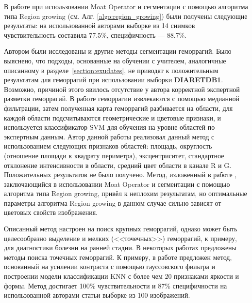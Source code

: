 \documentclass[12pt,fleqn]{article}
\begin{document}

В работе \cite{sinthanayothin} при использовании Moat Operator и сегментации с помощью алгоритма типа Region growing (см. Алг. \ref{algo:region_growing}) были получены следующие результаты: на использованной авторами выборке из 14 снимков чувствительность составила 77.5\%, специфичность --- 88.7\%.

Автором были исследованы и другие методы сегментации геморрагий. Было выяснено, что подходы, основанные на обучении с учителем, аналогичные описанному в разделе~\ref{section:exudates}, не приводят к положительным результатам для геморрагий при использовании выборки \textbf{DIARETDB1}. Возможно, причиной этого явилось отсутствие у автора корректной экспертной разметки геморрагий. В работе \cite{chernomorets} геморрагии извлекаются с помощью медианной фильтрации, затем полученная карта геморрагий разбивается на области, для каждой области подсчитываются геометрические и цветовые признаки, и используется классификатор SVM для обучения на уровне областей по экспертным данным. Автор данной работы реализовал данный метод с использованием следующих признаков областей: площадь, округлость (отношение площади к квадрату периметра), эксцентриситет, стандартное отклонение интенсивности в области, средний цвет области в канале R и G. Положительных результатов не было получено. Метод, изложенный в работе \cite{sinthanayothin}, заключающийся в использовании Moat Operator и сегментации с помощью алгоритма типа Region growing, привёл к неплохим результатам, но оптимальные параметры алгоритма Region growing в данном случае сильно зависят от цветовых свойств изображения. 

Описанный метод настроен на поиск крупных геморрагий, однако может быть целесообразно выделение и мелких (<<точечных>>) геморрагий, к примеру, для диагностики болезни на ранней стадии. В некоторых работах предложены методы поиска точечных геморрагий. К примеру, в работе \cite{niemeijer} предложен метод, основанный на усилении контраста с помощью гауссовского фильтра и построении модели классификации KNN с более чем 20 признаками яркости и формы. Метод достигает 100\% чувствительности и 87\% специфичности на использованной авторами статьи выборке из 100 изображений.
\end{document}
